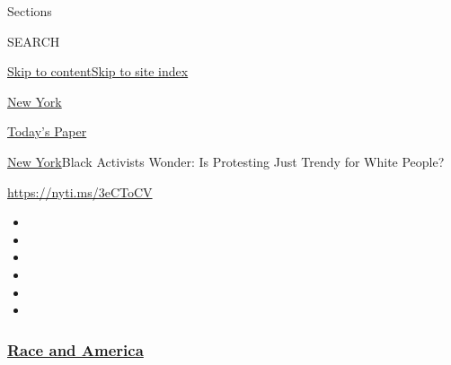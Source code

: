 Sections

SEARCH

\protect\hyperlink{site-content}{Skip to
content}\protect\hyperlink{site-index}{Skip to site index}

\href{https://www.nytimes3xbfgragh.onion/section/nyregion}{New York}

\href{https://myaccount.nytimes3xbfgragh.onion/auth/login?response_type=cookie\&client_id=vi}{}

\href{https://www.nytimes3xbfgragh.onion/section/todayspaper}{Today's
Paper}

\href{/section/nyregion}{New York}\textbar{}Black Activists Wonder: Is
Protesting Just Trendy for White People?

\url{https://nyti.ms/3eCToCV}

\begin{itemize}
\item
\item
\item
\item
\item
\item
\end{itemize}

\hypertarget{race-and-america}{%
\subsubsection{\texorpdfstring{\href{https://www.nytimes3xbfgragh.onion/news-event/george-floyd-protests-minneapolis-new-york-los-angeles?name=styln-george-floyd\&region=TOP_BANNER\&block=storyline_menu_recirc\&action=click\&pgtype=Article\&impression_id=326d0cc0-f1ba-11ea-bd45-53512389bd45\&variant=undefined}{Race
and America}}{Race and America}}\label{race-and-america}}

